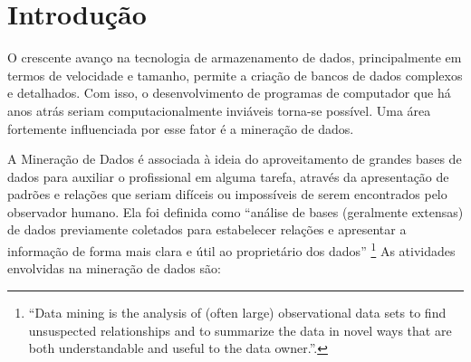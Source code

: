 \chapter{Introdução}

O crescente avanço na tecnologia de armazenamento de dados, principalmente em termos de velocidade e tamanho, permite a criação de bancos de dados complexos e detalhados. Com isso, o desenvolvimento de programas de computador que há anos atrás seriam computacionalmente inviáveis torna-se possível. Uma área fortemente influenciada por esse fator é a mineração de dados.

A Mineração de Dados é associada à ideia do aproveitamento de grandes bases de dados para auxiliar o profissional em alguma tarefa, através da apresentação de padrões e relações que seriam difíceis ou impossíveis de serem encontrados pelo observador humano. Ela foi definida como ``análise de bases (geralmente extensas) de dados previamente coletados para estabelecer relações e apresentar a informação de forma mais clara e útil ao proprietário dos dados'' \cite[p. 1]{Hand2001}\footnote{``Data mining is the analysis of (often large) observational data sets to find unsuspected relationships and to summarize the data in novel ways that are both understandable and useful to the data owner.''.} As atividades envolvidas na mineração de dados são:

